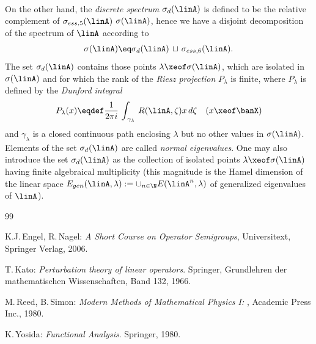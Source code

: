 \documentclass[11pt,twoside]{article}
\begin{document}
\paragraph{} %
On the other hand,
the \textit{discrete spectrum} $\sigma_d(\linA)$ is defined
to be the relative complement of $\sigma_{ess,5}(\linA)$ {\wrt} $\sigma(\linA)$,
hence we have a disjoint decomposition of the spectrum of $\linA$ according to
\[
\sigma(\linA) \eq \sigma_d(\linA) \, \sqcup \, \sigma_{ess,6}(\linA).
\]
The set $\sigma_d(\linA)$ contains those points $\lambda \xeof \sigma(\linA)$,
which are isolated in $\sigma(\linA)$
and for which the rank of the \textit{Riesz projection} $P_{\lambda}$ is finite,
where $P_{\lambda}$ is defined by the \textit{Dunford integral}
\begin{equation}\label{DUNFORD_FORMULA}
P_{\lambda}(x) \eqdef
\frac{1}{2 \pi i} \, \int_{\,\gamma_{\lambda}} \, R(\linA,\zeta) x \, d\zeta
\quad (x \xeof \banX)
\end{equation}
and $\gamma_{\lambda}$ is a closed continuous path enclosing $\lambda$
but no other values in $\sigma(\linA)$.
Elements of the set $\sigma_d(\linA)$ are called \textit{normal eigenvalues}.
One may also introduce the set $\sigma_d(\linA)$ as the collection
of isolated points $\lambda \xeof \sigma(\linA)$
having finite algebraical multiplicity
(this magnitude is the Hamel dimension of the linear space
$E_{gen}(\linA,\lambda) := \cup_{n \in \N} E(\linA^n,\lambda)$
of generalized eigenvalues of $\linA$).

\vspace{5mm}
\begin{thebibliography}{99}
\begin{small}

 K.J.\,Engel, R.\,Nagel:
\textit{A Short Course on Operator Semigroups},
Universitext, Springer Verlag, 2006.

 T.\,Kato:
\textit{{Perturbation theory of linear operators}}.
Springer, Grund\-lehren der mathematischen Wissenschaften, Band 132, 1966.

 M.\,Reed, B.\,Simon:
\textit{Modern Methods of Mathematical Physics I: {\FA}},
Academic Press Inc., 1980.

 K.\,Yosida:
\textit{Functional Analysis}.
Springer, 1980.

\end{small}
\end{thebibliography}
\end{document}
